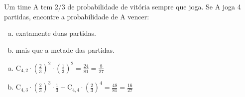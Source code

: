 \begin{ex}
   Um time A tem 2/3 de probabilidade de vitória sempre que joga. Se A joga 4 partidas, encontre a probabilidade de A vencer:
     \begin{enumerate} [(a)]
         \item exatamente duas partidas.
         \item mais que a metade das partidas.
     \end{enumerate}
        \begin{sol}
         \phantom{A}
           \begin{enumerate} [(a)]
               \item $\mathrm{C}_{4,2}\cdot(\frac{2}{3})^2\cdot(\frac{1}{3})^2=\frac{24}{81}=\frac{8}{27}$
               \item $\mathrm{C}_{4,3}\cdot(\frac{2}{3})^3\cdot\frac{1}{3}+\mathrm{C}_{4,4}\cdot(\frac{2}{3})^4=\frac{48}{81}=\frac{16}{27}$
           \end{enumerate}
        \end{sol}
  \end{ex}